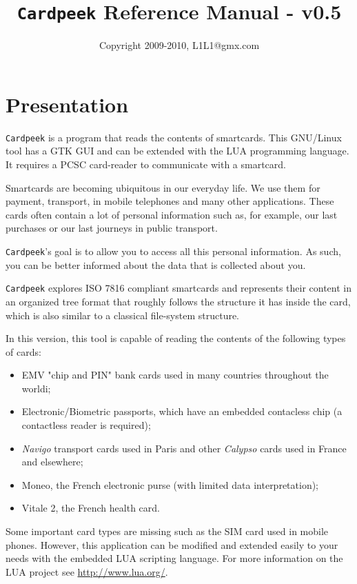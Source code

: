\documentclass[11pt]{report}
\title{\texttt{Cardpeek} Reference Manual - v0.5}
\author{Copyright 2009-2010, L1L1@gmx.com}
\begin{document}
\maketitle

\chapter*{Presentation}

\texttt{Cardpeek} is a program that reads the contents of smartcards. 
This GNU/Linux tool has a GTK GUI and can be extended with the LUA programming language. 
It requires a PCSC card-reader to communicate with a smartcard.

Smartcards are becoming ubiquitous in our everyday life. 
We use them for payment, transport, in mobile telephones and many other applications.
These cards often contain a lot of personal information such as, for example, our last purchases or 
our last journeys in public transport.

\texttt{Cardpeek}'s goal is to allow you to access all this personal information. As such, you 
can be better informed about the data that is collected about you.

\texttt{Cardpeek} explores ISO 7816 compliant smartcards and represents their content in an organized 
tree format that roughly follows the structure it has inside the card, which is also similar to a 
classical file-system structure.

In this version, this tool is capable of reading the contents of the following types of cards:
\begin{itemize}
\item{EMV "chip and PIN" bank cards used in many countries throughout the worldi;}
\item{Electronic/Biometric passports, which have an embedded contacless chip (a contactless reader is required);}
\item{\textit{Navigo} transport cards used in Paris and other \textit{Calypso} cards used in France and elsewhere;}
\item{Moneo, the French electronic purse (with limited data interpretation);}
\item{Vitale 2, the French health card.}
\end{itemize}

Some important card types are missing such as the SIM card used in mobile phones.
However, this application can be modified and extended easily to your needs with the embedded LUA scripting language.
For more information on the LUA project see \url{http://www.lua.org/}.
\end{document}
